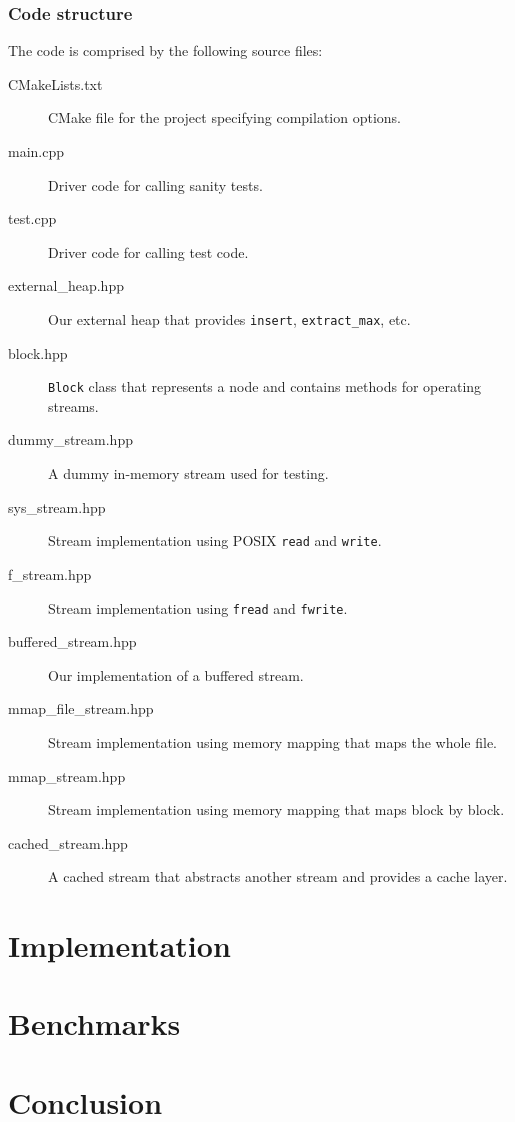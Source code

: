 \documentclass[a4paper,12pt]{article}
\begin{document}
\subsubsection{Code structure}
The code is comprised by the following source files:
\begin{description}
\item[CMakeLists.txt] CMake file for the project specifying
  compilation options.

\item[main.cpp] Driver code for calling sanity tests.

\item[test.cpp] Driver code for calling test code.

\item[external\_heap.hpp] Our external heap that provides \texttt{insert}, \texttt{extract\_max}, etc.

\item[block.hpp] \texttt{Block} class that represents a node and contains methods for operating streams.

\item[dummy\_stream.hpp] A dummy in-memory stream used for testing.

\item[sys\_stream.hpp] Stream implementation using POSIX \texttt{read} and \texttt{write}.

\item[f\_stream.hpp] Stream implementation using \texttt{fread} and \texttt{fwrite}.

\item[buffered\_stream.hpp] Our implementation of a buffered stream.

\item[mmap\_file\_stream.hpp] Stream implementation using memory mapping that maps the whole file.

\item[mmap\_stream.hpp] Stream implementation using memory mapping that maps block by block.

\item[cached\_stream.hpp] A cached stream that abstracts another stream and provides a cache layer.
\end{description}

\clearpage
\section{Implementation}


\section{Benchmarks}


\section{Conclusion}



\end{document}
